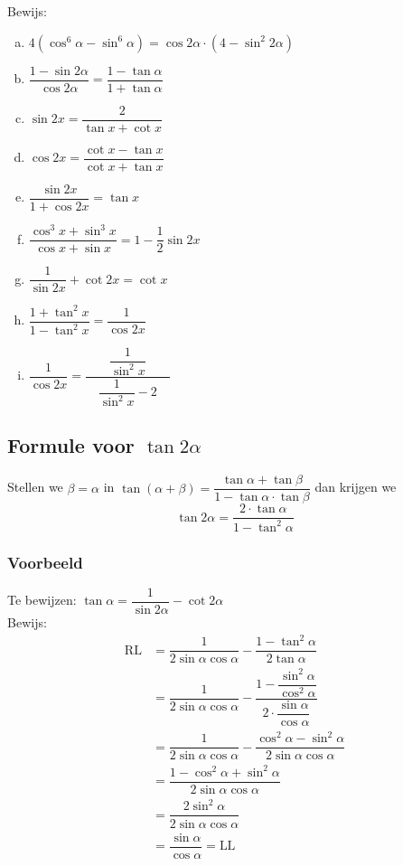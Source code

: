 \documentclass[twoside,a4paper,12pt]{article}
\begin{document}
\begin{oefening} %
Bewijs:
\begin{enumerate}[(a)]
  \itemsep.8em
  \item $\displaystyle 4(\cos^6\alpha-\sin^6\alpha)=\cos 2\alpha \cdot(4 - \sin^2 2\alpha)$
  \item $\displaystyle \dfrac{1-\sin 2\alpha}{\cos 2\alpha}=\dfrac{1-\tan\alpha}{1+\tan\alpha}$
  \item $\displaystyle \sin 2x = \dfrac{2}{\tan x + \cot x}$
  \item $\displaystyle \cos 2x = \dfrac{\cot x - \tan x}{\cot x + \tan x}$
  \item $\displaystyle \dfrac{\sin{2x}}{1+\cos 2x} = \tan x$
  \item $\displaystyle \dfrac{\cos^3 x + \sin^3 x}{\cos x + \sin x} = 1 - \dfrac{1}{2}\sin 2x$
  \item $\displaystyle \dfrac{1}{\sin 2x} + \cot 2x = \cot x$
  \item $\displaystyle \dfrac{1 + \tan^2x}{1 - \tan^2x} = \dfrac{1}{\cos 2x}$
  \item $\displaystyle \dfrac{1}{\cos 2x} = \dfrac{\dfrac{1}{\sin^2x}}{\quad\dfrac{1}{\sin^2x}-2\quad}$
\end{enumerate}
\end{oefening}

\subsection{Formule voor $\tan 2\alpha$}

Stellen we $\beta=\alpha$ in $\tan(\alpha + \beta)=\dfrac{\tan\alpha + \tan\beta}{1-\tan\alpha\cdot\tan\beta}$ dan krijgen we
$$\tan 2\alpha = \dfrac{2\cdot \tan\alpha}{1-\tan^2\alpha}$$

\subsubsection*{Voorbeeld}

Te bewijzen: $\tan\alpha = \dfrac{1}{\sin 2\alpha} - \cot 2\alpha$\\
Bewijs:
\begin{align*}
  \mbox{RL} &= \dfrac{1}{2\sin\alpha \cos\alpha}-\dfrac{1-\tan^2\alpha}{2\tan\alpha}\\
            &= \dfrac{1}{2\sin\alpha \cos\alpha}-\dfrac{1-\dfrac{\sin^2\alpha}{\cos^2\alpha}}{2\cdot \dfrac{\sin\alpha}{\cos\alpha}}\\
            &= \dfrac{1}{2\sin\alpha \cos\alpha}-\dfrac{\cos^2\alpha - \sin^2\alpha}{2\sin\alpha\cos\alpha}\\
            &= \dfrac{1 - \cos^2\alpha + \sin^2\alpha}{2\sin\alpha \cos\alpha}\\
            &= \dfrac{2\sin^2\alpha}{2\sin\alpha \cos\alpha}\\
            &= \dfrac{\sin\alpha}{\cos\alpha} = \mbox{LL}\\
\end{align*}
\end{document}
